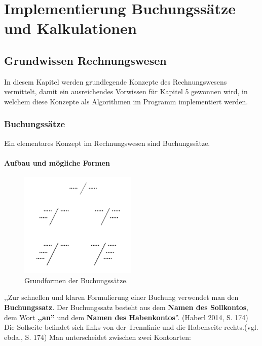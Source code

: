 \documentclass[12pt]{report}
\begin{document}
 





\part{Implementierung Buchungssätze und Kalkulationen}
 
 
\chapter{Grundwissen Rechnungswesen}
\lhead{\thepage}
In diesem Kapitel werden grundlegende Konzepte des Rechnungswesens vermittelt, damit ein ausreichendes Vorwissen für Kapitel 5 gewonnen wird, in welchem diese Konzepte als Algorithmen im Programm implementiert werden.
 
 
\section{Buchungssätze}
Ein elementares Konzept im Rechnungswesen sind Buchungssätze. 
 
\subsection{Aufbau und mögliche Formen}
 
\begin{figure}[h]
	\centering
	\includegraphics[height=5cm]{images/bs_types}
	\caption[Buchungssatzarten]{Grundformen der Buchungssätze.}
\end{figure}
  
\noindent ,,Zur schnellen und klaren Formulierung einer Buchung verwendet man den \textbf{Buchungssatz}. Der Buchungssatz besteht aus dem \textbf{Namen des Sollkontos}, dem Wort \textbf{,,an''} und dem \textbf{Namen des Habenkontos}''. (Haberl 2014, S. 174\nocite{RW1}) Die Sollseite befindet sich links von der Trennlinie und die Habenseite rechts.(vgl. ebda., S. 174\nocite{RW1}) Man unterscheidet zwischen zwei Kontoarten: \\
\end{document}
